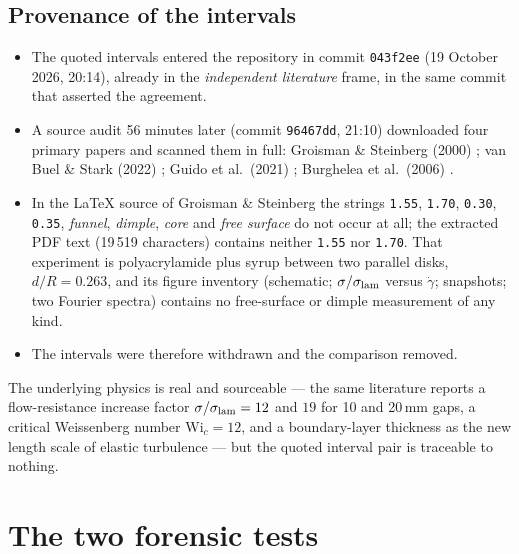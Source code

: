 \documentclass[11pt,a4paper]{article}
\begin{document}
\subsection{Provenance of the intervals}
\begin{itemize}
    \item The quoted intervals entered the repository in commit
    \texttt{043f2ee} (19 October 2026, 20:14), already in the
    \emph{independent literature} frame, in the same commit that asserted
    the agreement.
    \item A source audit 56 minutes later (commit \texttt{96467dd},
    21:10) downloaded four primary papers and scanned them in full:
    Groisman \& Steinberg (2000) \cite{gs2000}; van Buel \& Stark (2022)
    \cite{vbs2022}; Guido et al.\ (2021) \cite{guido2021}; Burghelea et al.\
    (2006) \cite{bss2006}.
    \item In the LaTeX source of Groisman \& Steinberg the strings
    \texttt{1.55}, \texttt{1.70}, \texttt{0.30}, \texttt{0.35},
    \emph{funnel}, \emph{dimple}, \emph{core} and \emph{free surface} do not
    occur at all; the extracted PDF text (19\,519 characters) contains
    neither \texttt{1.55} nor \texttt{1.70}. That experiment is
    polyacrylamide plus syrup between two parallel disks, $d/R = 0.263$, and
    its figure inventory (schematic; $\sigma/\sigma_{\rm lam}$ versus
    $\dot\gamma$; snapshots; two Fourier spectra) contains no free-surface or
    dimple measurement of any kind.
    \item The intervals were therefore withdrawn and the comparison removed.
\end{itemize}
The underlying physics is real and sourceable --- the same literature
reports a flow-resistance increase factor $\sigma/\sigma_{\rm lam} = 12$ and
$19$ for 10 and 20\,mm gaps, a critical Weissenberg number
$\mathrm{Wi}_c = 12$, and a boundary-layer thickness as the new length
scale of elastic turbulence --- but the quoted interval pair is traceable to
nothing.

\section{The two forensic tests}
\end{document}
